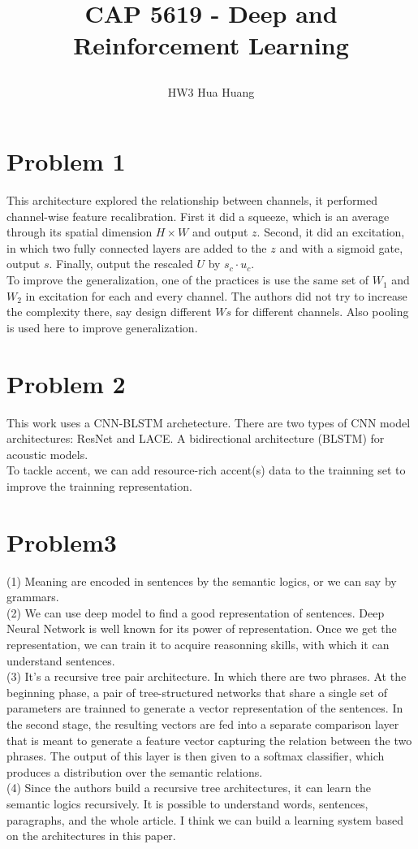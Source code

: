 \documentclass[12pt]{article}
\begin{document}
\title*{\centerline{\huge{CAP 5619 \-- Deep and Reinforcement Learning}}}
\author*{\centerline{HW3 Hua Huang}}%


\section{Problem 1}
This architecture explored the relationship between channels, it performed 
channel\--wise feature recalibration. First it did a squeeze, which is an average
through its spatial dimension $H\times W$ and output $z$. Second, it did an 
excitation, in which two fully connected layers are added to the $z$ and with 
a sigmoid gate, output $s$. Finally, output the rescaled $U$ by $s_c \cdot u_c$.\\
To improve the generalization, one of the practices is use the same set of $W_1$ and
$W_2$ in excitation for each and every channel. The authors did not try to increase
the complexity there, say design different $Ws$ for different channels. Also pooling
is used here to improve generalization.

\section{Problem 2}
This work uses a CNN\--BLSTM archetecture. There are two types of CNN model 
architectures: ResNet and LACE. A bidirectional architecture (BLSTM) for acoustic
models.\\
To tackle accent, we can add resource\--rich accent(s) data 
to the trainning set to improve the trainning representation.

\section{Problem3}
(1) Meaning are encoded in sentences by the semantic logics, or we can say by 
grammars.\\
(2) We can use deep model to find a good representation of sentences. Deep Neural 
Network is well known for its power of representation. Once we get the 
representation, we can train it to acquire reasonning skills, with which it can 
understand sentences.\\
(3) It's a recursive tree pair architecture. In which there are two phrases.  At the
beginning phase, a pair of tree-structured networks that share a single set of 
parameters are trainned to generate a vector representation of the sentences. In the
second stage, the resulting vectors are fed into a separate comparison layer that is
meant to generate a feature vector capturing the relation between the two phrases.
The output of this layer is then given to a softmax classifier, which produces a 
distribution over the semantic relations.\\
(4) Since the authors build a recursive tree architectures, it can learn the 
semantic logics recursively. It is possible to understand words, sentences,
paragraphs, and the whole article. I think we can build a learning system based on 
the architectures in this paper.
\end{document}

